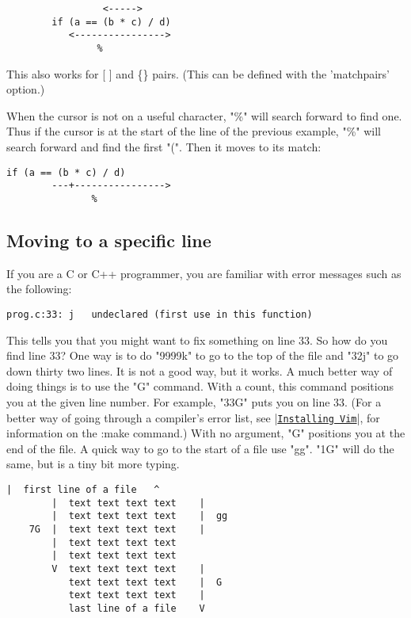 \begin{Verbatim}[samepage=true]
                   %
                 <----->
        if (a == (b * c) / d) 
           <---------------->
                %
\end{Verbatim}

This also works for [ ] and \{\} pairs.
(This can be defined with the 'matchpairs' option.)

When the cursor is not on a useful character, "\%" will search forward to find one.
Thus if the cursor is at the start of the line of the previous example, "\%" will search forward and find the first "(".
Then it moves to its match:

\begin{Verbatim}[samepage=true]
        if (a == (b * c) / d) 
        ---+---------------->
               %
\end{Verbatim}


\subsection{Moving to a specific line}

If you are a C or C++ programmer, you are familiar with error messages such as the following:

		\begin{Verbatim}[samepage=true]
    prog.c:33: j   undeclared (first use in this function) 
		\end{Verbatim}

This tells you that you might want to fix something on line 33.
So how do you find line 33?  One way is to do "9999k" to go to the top of the file and "32j" to go down thirty two lines.
It is not a good way, but it works.
A much better way of doing things is to use the "G" command.
With a count, this command positions you at the given line number.
For example, "33G" puts you on line 33.
(For a better way of going through a compiler's error list, see |\hyperref[Installing Vim]{\texttt{Installing Vim}}|, for information on the :make command.) With no argument, "G" positions you at the end of the file.
A quick way to go to the start of a file use "gg".
"1G" will do the same, but is a tiny bit more typing.
 
\begin{Verbatim}[samepage=true]
        |  first line of a file   ^
        |  text text text text    |
        |  text text text text    |  gg
    7G  |  text text text text    |
        |  text text text text
        |  text text text text
        V  text text text text    |
           text text text text    |  G
           text text text text    |
           last line of a file    V
\end{Verbatim}

